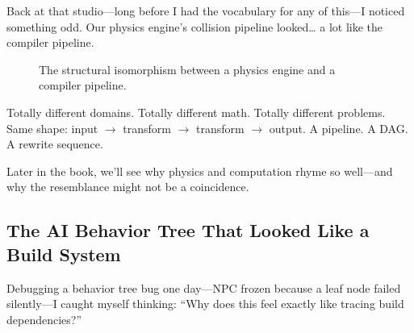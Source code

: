 Back at that studio—long before I had the vocabulary for any of this—I noticed something odd. Our physics engine's collision pipeline looked… a lot like the compiler pipeline.

\begin{figure}[h]
    \centering
    \caption{The structural isomorphism between a physics engine and a compiler pipeline.}
\label{fig:pipeline-isomorphism}
\end{figure}

Totally different domains. Totally different math. Totally different problems. Same shape:  
input $\rightarrow$ transform $\rightarrow$ transform $\rightarrow$ output.  
A pipeline. A DAG. A rewrite sequence.

Later in the book, we’ll see why physics and computation rhyme so well—and why the resemblance might not be a coincidence.

\subsection{The AI Behavior Tree That Looked Like a Build System}

Debugging a behavior tree bug one day—NPC frozen because a leaf node failed silently—I caught myself thinking: ``Why does this feel exactly like tracing build dependencies?''

